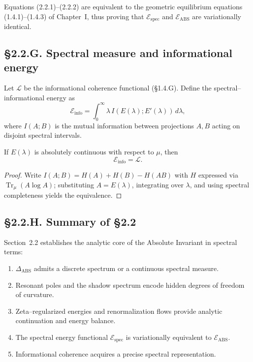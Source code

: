 \begin{corollary}
Equations (2.2.1)–(2.2.2) are equivalent to the geometric equilibrium equations (1.4.1)–(1.4.3) of Chapter~I, thus proving that $\mathcal{E}_{\mathrm{spec}}$ and $\mathcal{E}_{\mathrm{ABS}}$ are variationally identical.
\end{corollary}

\subsection*{§2.2.G. Spectral measure and informational energy}

\begin{definition}
Let $\mathcal{L}$ be the informational coherence functional (§1.4.G).  
Define the spectral–informational energy as
\[
\mathcal{E}_{\mathrm{info}}
=\int_0^\infty \lambda\, I(E(\lambda);E'(\lambda))\,d\lambda,
\]
where $I(A;B)$ is the mutual information between projections $A,B$ acting on disjoint spectral intervals.
\end{definition}

\begin{theorem}\label{thm:2.2.info}
If $E(\lambda)$ is absolutely continuous with respect to $\mu$, then
\[
\mathcal{E}_{\mathrm{info}}
=\mathcal{L}.
\]
\end{theorem}

\begin{proof}
Write $I(A;B)=H(A)+H(B)-H(AB)$ with $H$ expressed via $\operatorname{Tr}_\mu(A\log A)$; substituting $A=E(\lambda)$, integrating over $\lambda$, and using spectral completeness yields the equivalence.
\end{proof}

\subsection*{§2.2.H. Summary of §2.2}

Section~2.2 establishes the analytic core of the Absolute Invariant in spectral terms:
\begin{enumerate}
  \item $\Delta_{\mathrm{ABS}}$ admits a discrete spectrum or a continuous spectral measure.
  \item Resonant poles and the shadow spectrum encode hidden degrees of freedom of curvature.
  \item Zeta–regularized energies and renormalization flows provide analytic continuation and energy balance.
  \item The spectral energy functional $\mathcal{E}_{\mathrm{spec}}$ is variationally equivalent to $\mathcal{E}_{\mathrm{ABS}}$.
  \item Informational coherence acquires a precise spectral representation.
\end{enumerate}


